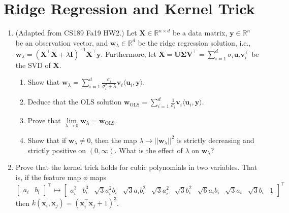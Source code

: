 \documentclass{article}
\begin{document}
\section{Ridge Regression and Kernel Trick}
\begin{enumerate}[label=\arabic*.]
\item (Adapted from CS189 Fa19 HW2.) Let $\mathbf{X} \in \mathbb{R}^{n \times d}$ be a data matrix, $\mathbf{y} \in \mathbb{R}^n$ be an observation vector, and $\mathbf{w}_\lambda \in \mathbb{R}^d$ be the ridge regression solution, i.e., $\mathbf{w}_\lambda = (\mathbf{X^{\top}X} + \lambda\mathbf{I})^{-1}\mathbf{X^{\top}y}$. Furthermore, let $\mathbf{X} = \mathbf{U\Sigma V^{\top}} = \sum\limits_{i = 1}^d \sigma_i\mathbf{u}_i\mathbf{v}_i^{\top}$ be the SVD of $\mathbf{X}$.
		\begin{enumerate}
		\item Show that $\mathbf{w}_\lambda = \sum\limits_{i=1}^d \frac{\sigma_i}{\sigma_i^2 + \lambda} \mathbf{v}_i\langle \mathbf{u}_i, \mathbf{y} \rangle$.
		\item Deduce that the OLS solution $\mathbf{w}_{\text{OLS}} = \sum\limits_{i=1}^d \frac{1}{\sigma_i} \mathbf{v}_i\langle \mathbf{u}_i, \mathbf{y} \rangle$.
		\item Prove that $\lim\limits_{\lambda \rightarrow 0} \mathbf{w}_\lambda = \mathbf{w}_\text{OLS}$.
		\item Show that if $\mathbf{w}_\lambda \neq 0$, then the map $\lambda \rightarrow ||\mathbf{w}_\lambda ||^2$ is strictly decreasing and strictly positive on $(0, \infty)$. What is the effect of $\lambda$ on $\mathbf{w}_\lambda$?
		\end{enumerate}
\item Prove that the kernel trick holds for cubic polynomials in two variables. That is, if the feature map $\phi$ maps $$\begin{bmatrix} a_i & b_i \end{bmatrix}^{\top} \mapsto \begin{bmatrix} a_i^3 & b_i^3 & \sqrt{3}a_i^2b_i & \sqrt{3}a_ib_i^2 & \sqrt{3}a_i^2 & \sqrt{3}b_i^2 & \sqrt{6}a_ib_i & \sqrt{3}a_i & \sqrt{3}b_i & 1 \end{bmatrix}^{\top}$$ then $k(\mathbf{x}_i, \mathbf{x}_j) = (\mathbf{x}_i^{\top}\mathbf{x}_j + 1)^3$.
\end{enumerate}
\end{document}
